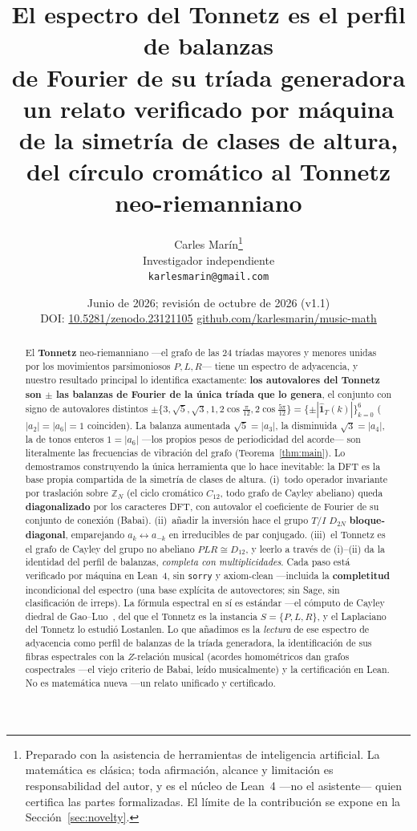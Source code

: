 \documentclass[11pt]{article}
\title{\bf El espectro del Tonnetz es el perfil de balanzas\\ de Fourier de su tr\'iada generadora\\[5pt]
\large\rm un relato verificado por m\'aquina de la simetr\'ia de clases de altura,\\ del c\'irculo crom\'atico al Tonnetz neo-riemanniano}
\author{Carles Mar\'in\thanks{Preparado con la asistencia de herramientas de inteligencia artificial.
La matem\'atica es cl\'asica; toda afirmaci\'on, alcance y limitaci\'on es responsabilidad del autor, y
es el n\'ucleo de Lean~4 ---no el asistente--- quien certifica las partes formalizadas. El l\'imite de la
contribuci\'on se expone en la Secci\'on~\ref{sec:novelty}.}\\[3pt]
  \normalsize Investigador independiente\\
  \normalsize \texttt{karlesmarin@gmail.com}}
\date{Junio de 2026; revisión de octubre de 2026 (v1.1)\\[3pt]\normalsize DOI: \href{https://doi.org/10.5281/zenodo.23121105}{10.5281/zenodo.23121105}
\quad\textbullet\quad \href{https://github.com/karlesmarin/music-math}{github.com/karlesmarin/music-math}}
\newcommand{\lean}[1]{\texttt{#1}}
\newcommand{\Zn}[1]{\mathbb{Z}_{#1}}
\begin{document}
\maketitle

\begin{abstract}\noindent
El \textbf{Tonnetz} neo-riemanniano ---el grafo de las $24$ tr\'iadas mayores y menores unidas por los
movimientos parsimoniosos $P,L,R$--- tiene un espectro de adyacencia, y nuestro resultado principal lo
identifica exactamente: \textbf{los autovalores del Tonnetz son $\pm$ las balanzas de Fourier de la \'unica
tr\'iada que lo genera}, el conjunto con signo de autovalores distintos $\pm\{3,\sqrt5,\sqrt3,1,2\cos\frac{\pi}{12},
2\cos\frac{5\pi}{12}\}=\{\pm|\hat{\mathbf 1}_T(k)|\}_{k=0}^{6}$ ($|a_2|=|a_6|=1$ coinciden). La balanza aumentada $\sqrt5=|a_3|$, la
disminuida $\sqrt3=|a_4|$, la de tonos enteros $1=|a_6|$ ---los propios pesos de periodicidad del acorde---
son literalmente las frecuencias de vibraci\'on del grafo (Teorema~\ref{thm:main}). Lo demostramos
construyendo la \'unica herramienta que lo hace inevitable: la DFT es la base propia compartida de la
simetr\'ia de clases de altura. (i)~todo operador invariante por traslaci\'on sobre $\Zn{N}$ (el ciclo
crom\'atico $C_{12}$, todo grafo de Cayley abeliano) queda \textbf{diagonalizado} por los caracteres DFT,
con autovalor el coeficiente de Fourier de su conjunto de conexi\'on (Babai). (ii)~a\~nadir la inversi\'on
hace el grupo $T/I$ $D_{2N}$ \textbf{bloque-diagonal}, emparejando $a_k\leftrightarrow a_{-k}$ en
irreducibles de par conjugado. (iii)~el Tonnetz es el grafo de Cayley del grupo no abeliano $PLR\cong D_{12}$,
y leerlo a trav\'es de (i)--(ii) da la identidad del perfil de balanzas, \emph{completa con multiplicidades}.
Cada paso est\'a verificado por m\'aquina en Lean~4, sin \lean{sorry} y axiom-clean ---incluida la
\textbf{completitud} incondicional del espectro (una base expl\'icita de autovectores; sin Sage, sin
clasificaci\'on de irreps). La f\'ormula espectral en s\'i es est\'andar ---el c\'omputo de Cayley diedral de
Gao--Luo~\cite{GaoLuo}, del que el Tonnetz es la instancia $S=\{P,L,R\}$, y el Laplaciano del Tonnetz lo
estudi\'o Lostanlen. Lo que a\~nadimos es la \emph{lectura} de ese espectro de adyacencia como perfil de
balanzas de la tr\'iada generadora, la identificaci\'on de sus fibras espectrales con la $Z$-relaci\'on
musical (acordes homom\'etricos dan grafos cospectrales ---el viejo criterio de Babai, le\'ido musicalmente)
y la certificaci\'on en Lean. No es matem\'atica nueva ---un relato unificado y certificado.
\end{abstract}
\end{document}
